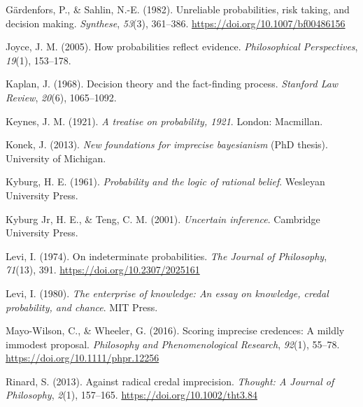 \documentclass[
  10pt,
  dvipsnames,enabledeprecatedfontcommands]{scrartcl}
\newlength{\cslhangindent}
\newlength{\cslentryspacingunit} %
\newenvironment{CSLReferences}[2] %
 {%
  \setlength{\parindent}{0pt}
  \ifodd #1
  \let\oldpar\par
  \def\par{\hangindent=\cslhangindent\oldpar}
  \fi
  \setlength{\parskip}{#2\cslentryspacingunit}
 }%
 {}
\begin{document}
\begin{CSLReferences}{1}{0}
\leavevmode{}%
Gärdenfors, P., \& Sahlin, N.-E. (1982). Unreliable probabilities, risk
taking, and decision making. \emph{Synthese}, \emph{53}(3), 361--386.
\url{https://doi.org/10.1007/bf00486156}

\leavevmode{}%
Joyce, J. M. (2005). How probabilities reflect evidence.
\emph{Philosophical Perspectives}, \emph{19}(1), 153--178.

\leavevmode{}%
Kaplan, J. (1968). Decision theory and the fact-finding process.
\emph{Stanford Law Review}, \emph{20}(6), 1065--1092.

\leavevmode{}%
Keynes, J. M. (1921). \emph{A treatise on probability, 1921}. London:
Macmillan.

\leavevmode{}%
Konek, J. (2013). \emph{New foundations for imprecise bayesianism} (PhD
thesis). University of Michigan.

\leavevmode{}%
Kyburg, H. E. (1961). \emph{Probability and the logic of rational
belief}. Wesleyan University Press.

\leavevmode{}%
Kyburg Jr, H. E., \& Teng, C. M. (2001). \emph{Uncertain inference}.
Cambridge University Press.

\leavevmode{}%
Levi, I. (1974). On indeterminate probabilities. \emph{The Journal of
Philosophy}, \emph{71}(13), 391. \url{https://doi.org/10.2307/2025161}

\leavevmode{}%
Levi, I. (1980). \emph{The enterprise of knowledge: An essay on
knowledge, credal probability, and chance}. MIT Press.

\leavevmode{}%
Mayo-Wilson, C., \& Wheeler, G. (2016). Scoring imprecise credences: A
mildly immodest proposal. \emph{Philosophy and Phenomenological
Research}, \emph{92}(1), 55--78.
\url{https://doi.org/10.1111/phpr.12256}

\leavevmode{}%
Rinard, S. (2013). Against radical credal imprecision. \emph{Thought: A
Journal of Philosophy}, \emph{2}(1), 157--165.
\url{https://doi.org/10.1002/tht3.84}


\end{CSLReferences}
\end{document}
